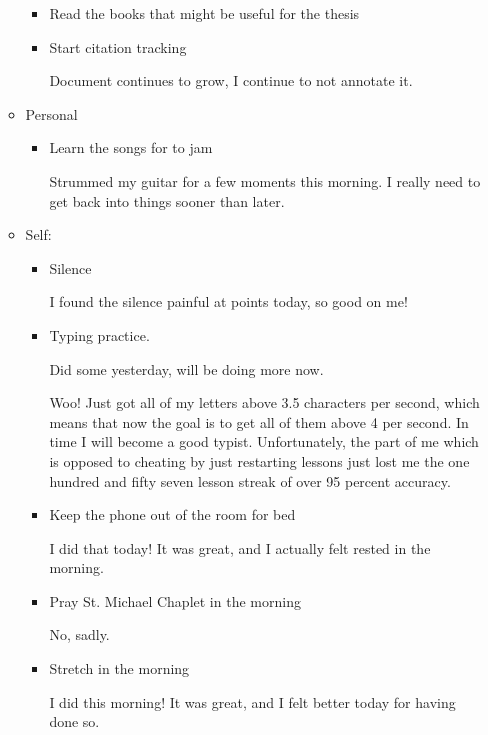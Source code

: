 \documentclass[12pt]{article}
\renewcommand{\,}{\textsuperscript{,}}
\begin{document}
\begin{itemize}
\begin{itemize}
\begin{itemize}
\item Read the books that might be useful for the thesis

\item Start citation tracking

Document continues to grow, I continue to not annotate it.

\end{itemize}

\item Personal

\begin{itemize}

\item Learn the songs for to jam

Strummed my guitar for a few moments this morning.  
I really need to get back into things sooner than later.

\end{itemize}

\item Self:

\begin{itemize}

\item Silence

I found the silence painful at points today, so good on me!

\item Typing practice.

Did some yesterday, will be doing more now.

Woo! Just got all of my letters above 3.5 characters per second, which means that now the goal is to get all of them above 4 per second.  
In time I will become a good typist.  
Unfortunately, the part of me which is opposed to cheating by just restarting lessons just lost me the one hundred and fifty seven lesson streak of over 95 percent accuracy.

\item Keep the phone out of the room for bed

I did that today! It was great, and I actually felt rested in the morning.

\item Pray St. Michael Chaplet in the morning

No, sadly.

\item Stretch in the morning

I did this morning! It was great, and I felt better today for having done so.


\end{itemize}
\end{itemize}
\end{itemize}
\end{document}
